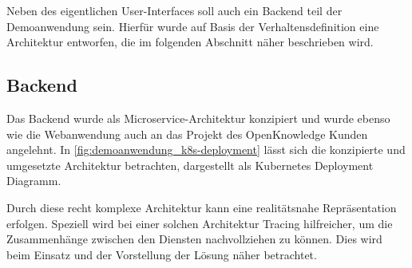 









Neben des eigentlichen User-Interfaces soll auch ein Backend teil der Demoanwendung sein. Hierfür wurde auf Basis der Verhaltensdefinition eine Architektur entworfen, die im folgenden Abschnitt näher beschrieben wird.

\subsection{Backend}

Das Backend wurde als Microservice-Architektur konzipiert und wurde ebenso wie die Webanwendung auch an das Projekt des OpenKnowledge Kunden angelehnt. In \autoref{fig:demoanwendung_k8s-deployment} lässt sich die konzipierte und umgesetzte Architektur betrachten, dargestellt als Kubernetes \cite{KubernetesComponents} Deployment Diagramm.

Durch diese recht komplexe Architektur kann eine realitätsnahe Repräsentation erfolgen. Speziell wird bei einer solchen Architektur Tracing hilfreicher, um die Zusammenhänge zwischen den Diensten nachvollziehen zu können. Dies wird beim Einsatz und der Vorstellung der Lösung näher betrachtet.

